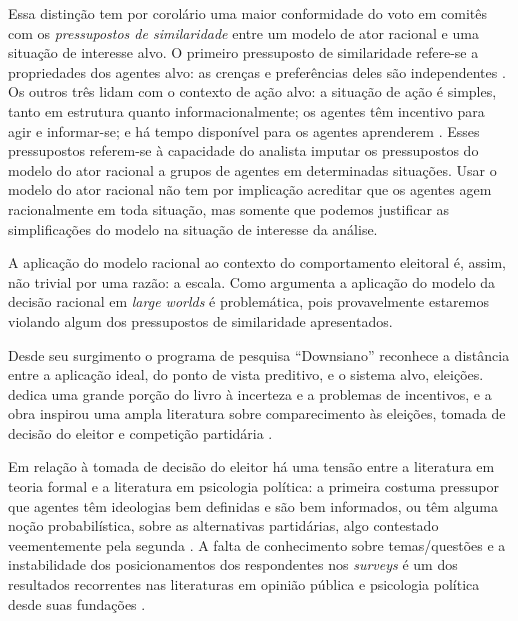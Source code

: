 Essa distinção tem por corolário uma maior conformidade do voto em comitês com
os \textit{pressupostos de similaridade} entre um modelo de ator racional e uma
situação de interesse alvo. O primeiro pressuposto de similaridade refere-se a
propriedades dos agentes alvo: as crenças e preferências deles são independentes
\cite{binmore2008rational}. Os outros três lidam com o contexto de ação alvo: a
situação de ação é simples, tanto em estrutura quanto informacionalmente; os
agentes têm incentivo para agir e informar-se; e há tempo disponível para os
agentes aprenderem \cite{binmore2007work, page2008uncertainty}. Esses
pressupostos referem-se à capacidade do analista imputar os pressupostos do
modelo do ator racional a grupos de agentes em determinadas situações. Usar o
modelo do ator racional não tem por implicação acreditar que os agentes agem
racionalmente em toda situação, mas somente que podemos justificar as
simplificações do modelo na situação de interesse da análise.

A aplicação do modelo racional ao contexto do comportamento eleitoral é, assim,
não trivial por uma razão: a escala. Como argumenta
 a aplicação do modelo da decisão racional em
\textit{large worlds} é problemática, pois provavelmente estaremos violando
algum dos pressupostos de similaridade apresentados.

Desde seu surgimento o programa de pesquisa ``Downsiano'' reconhece a distância
entre a aplicação ideal, do ponto de vista preditivo, e o sistema alvo,
eleições.  dedica uma grande porção do livro à
incerteza e a problemas de incentivos, e a obra inspirou uma ampla literatura
sobre comparecimento às eleições, tomada de decisão do eleitor e competição
partidária \cite{bendor2011behavioral}.

Em relação à tomada de decisão do eleitor há uma tensão entre a literatura em
teoria formal e a literatura em psicologia política: a primeira costuma
pressupor que agentes têm ideologias bem definidas e são bem informados, ou têm
alguma noção probabilística, sobre as alternativas partidárias, algo contestado
veementemente pela segunda \cite[p.5]{bendor2011behavioral}. A falta de
conhecimento sobre temas/questões e a instabilidade dos posicionamentos dos
respondentes nos \textit{surveys} é um dos resultados recorrentes nas
literaturas em opinião pública e psicologia política desde suas fundações
\cite{berelson1952democratic, converse2006nature, zaller1992simple,
  kuklinski2000misinformation}.

